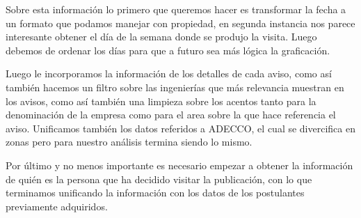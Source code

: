 \documentclass[11pt]{article}
\begin{document}
Sobre esta información lo primero que queremos hacer es transformar la
fecha a un formato que podamos manejar con propiedad, en segunda
instancia nos parece interesante obtener el día de la semana donde se
produjo la visita. Luego debemos de ordenar los días para que a futuro
sea más lógica la graficación.

Luego le incorporamos la información de los detalles de cada aviso, como
así también hacemos un filtro sobre las ingenierías que más relevancia
muestran en los avisos, como así también una limpieza sobre los acentos
tanto para la denominación de la empresa como para el area sobre la que
hace referencia el aviso. Unificamos también los datos referidos a
ADECCO, el cual se divercifica en zonas pero para nuestro análisis
termina siendo lo mismo.

Por último y no menos importante es necesario empezar a obtener la
información de quién es la persona que ha decidido visitar la
publicación, con lo que terminamos unificando la información con los
datos de los postulantes previamente adquiridos.
\end{document}
